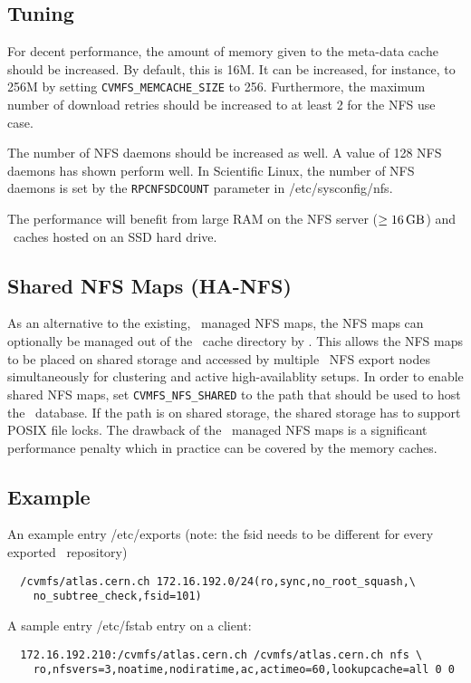 \subsection{Tuning}
For decent performance, the amount of memory given to the meta-data cache should be increased. 
By default, this is 16M.
It can be increased, for instance, to 256M by setting \texttt{CVMFS\_MEMCACHE\_SIZE} to 256.
Furthermore, the maximum number of download retries should be increased to at least 2 for the NFS use case.

The number of NFS daemons should be increased as well.
A value of 128 NFS daemons has shown perform well.
In Scientific Linux, the number of NFS daemons is set by the \texttt{RPCNFSDCOUNT} parameter in /etc/sysconfig/nfs.

The performance will benefit from large RAM on the NFS server ($\geq\SI{16}{\giga\byte}$) and \cvmfs\ caches hosted on an SSD hard drive.

\subsection{Shared NFS Maps (HA-NFS)}
As an alternative to the existing, \leveldb\ managed NFS maps, the NFS maps can optionally be managed out of the \cvmfs\ cache directory by \sqlite.
This allows the NFS maps to be placed on shared storage and accessed by multiple \cvmfs\ NFS export nodes simultaneously for clustering and active high-availablity setups.
In order to enable shared NFS maps, set \texttt{CVMFS\_NFS\_SHARED} to the path that should be used to host the \sqlite\ database.  
If the path is on shared storage, the shared storage has to support POSIX file locks.
The drawback of the \sqlite\ managed NFS maps is a significant performance penalty which in practice can be covered by the memory caches.

\subsection{Example}
An example entry /etc/exports (note: the fsid needs to be different for every exported \cvmfs\ repository)
\begin{verbatim}
  /cvmfs/atlas.cern.ch 172.16.192.0/24(ro,sync,no_root_squash,\
    no_subtree_check,fsid=101)
\end{verbatim}
A sample entry /etc/fstab entry on a client:
\begin{verbatim}
  172.16.192.210:/cvmfs/atlas.cern.ch /cvmfs/atlas.cern.ch nfs \
    ro,nfsvers=3,noatime,nodiratime,ac,actimeo=60,lookupcache=all 0 0
\end{verbatim}


